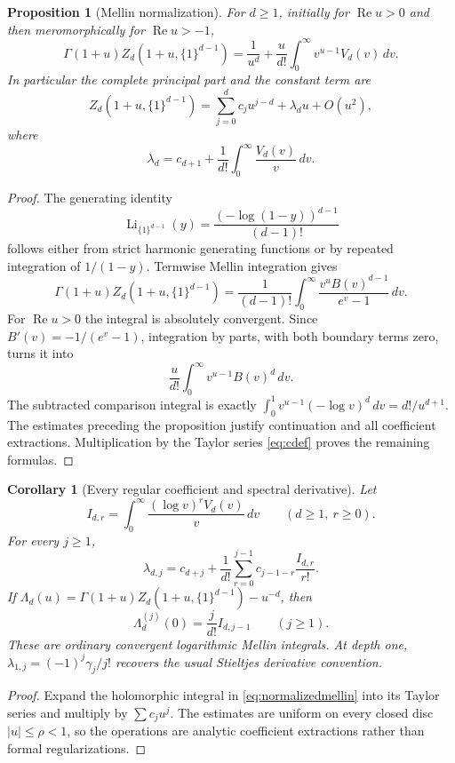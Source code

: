 \documentclass[11pt,a4paper]{article}
\numberwithin{equation}{section}
\newtheorem{proposition}[theorem]{Proposition}
\newtheorem{corollary}[theorem]{Corollary}
\theoremstyle{definition}
\DeclareMathOperator{\Li}{Li}
\newcommand{\re}{\operatorname{Re}}
\begin{document}
\begin{proposition}[Mellin normalization]\label{prop:mellin}
For $d\ge1$, initially for $\re u>0$ and then meromorphically for
$\re u>-1$,
\begin{equation}\label{eq:normalizedmellin}
 \boxed{\displaystyle
 \Gamma(1+u)Z_d(1+u,\{1\}^{d-1})
   =\frac1{u^d}+\frac{u}{d!}
       \int_0^\infty v^{u-1}V_d(v)\,dv.}
\end{equation}
In particular the complete principal part and the constant term are
\begin{equation}\label{eq:principal}
 Z_d(1+u,\{1\}^{d-1})
 =\sum_{j=0}^d c_j u^{j-d}+\lambda_du+O(u^2),
\end{equation}
where
\begin{equation}\label{eq:lambda_integral}
 \lambda_d=c_{d+1}+\frac1{d!}\int_0^\infty\frac{V_d(v)}v\,dv.
\end{equation}
\end{proposition}
\begin{proof}
The generating identity
\[
 \Li_{\{1\}^{d-1}}(y)=\frac{(-\log(1-y))^{d-1}}{(d-1)!}
\]
follows either from strict harmonic generating functions or by
repeated integration of $1/(1-y)$. Termwise Mellin integration gives
\[
 \Gamma(1+u)Z_d(1+u,\{1\}^{d-1})
  =\frac1{(d-1)!}\int_0^\infty
       \frac{v^u B(v)^{d-1}}{e^v-1}\,dv.
\]
For $\re u>0$ the integral is absolutely convergent. Since
$B'(v)=-1/(e^v-1)$, integration by parts, with both boundary terms
zero, turns it into
\[
 \frac{u}{d!}\int_0^\infty v^{u-1}B(v)^d\,dv.
\]
The subtracted comparison integral is exactly
$\int_0^1v^{u-1}(-\log v)^d\,dv=d!/u^{d+1}$.
The estimates preceding the proposition justify continuation and all
coefficient extractions. Multiplication by the Taylor series
\eqref{eq:cdef} proves the remaining formulas.
\end{proof}

\begin{corollary}[Every regular coefficient and spectral derivative]
\label{cor:allcoefficients}
Let
\[
 I_{d,r}=\int_0^\infty \frac{(\log v)^r V_d(v)}v\,dv
 \qquad(d\ge1,\ r\ge0).
\]
For every $j\ge1$,
\begin{equation}\label{eq:alllaurent}
 \lambda_{d,j}=c_{d+j}
  +\frac1{d!}\sum_{r=0}^{j-1}
       c_{j-1-r}\frac{I_{d,r}}{r!}.
\end{equation}
If $\Lambda_d(u)=\Gamma(1+u)Z_d(1+u,\{1\}^{d-1})-u^{-d}$,
then
\begin{equation}\label{eq:normalizedderivatives}
 \Lambda_d^{(j)}(0)=\frac{j}{d!}I_{d,j-1}\qquad(j\ge1).
\end{equation}
These are ordinary convergent logarithmic Mellin integrals. At depth
one, $\lambda_{1,j}=(-1)^j\gamma_j/j!$ recovers the usual Stieltjes
derivative convention.
\end{corollary}
\begin{proof}
Expand the holomorphic integral in \eqref{eq:normalizedmellin} into
its Taylor series and multiply by $\sum c_ju^j$. The estimates are
uniform on every closed disc $|u|\le\rho<1$, so the operations are
analytic coefficient extractions rather than formal regularizations.
\end{proof}
\end{document}
